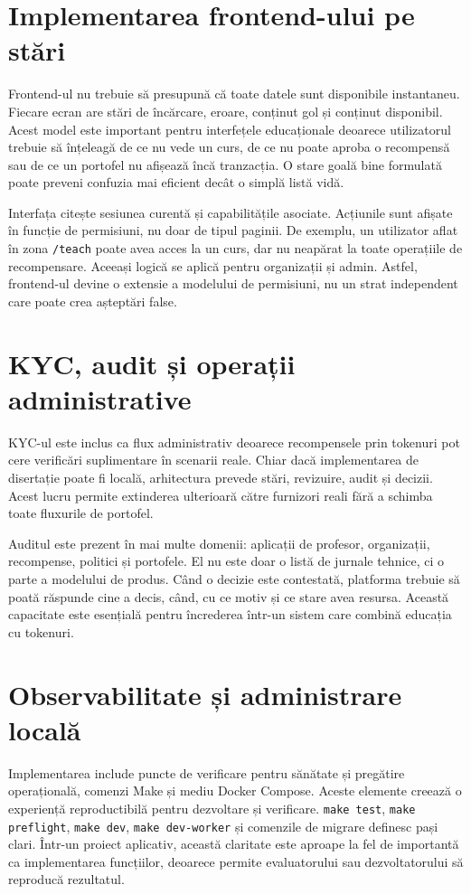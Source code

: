\section{Implementarea frontend-ului pe stări}
Frontend-ul nu trebuie să presupună că toate datele sunt disponibile instantaneu. Fiecare ecran are stări de încărcare, eroare, conținut gol și conținut disponibil. Acest model este important pentru interfețele educaționale deoarece utilizatorul trebuie să înțeleagă de ce nu vede un curs, de ce nu poate aproba o recompensă sau de ce un portofel nu afișează încă tranzacția. O stare goală bine formulată poate preveni confuzia mai eficient decât o simplă listă vidă.

Interfața citește sesiunea curentă și capabilitățile asociate. Acțiunile sunt afișate în funcție de permisiuni, nu doar de tipul paginii. De exemplu, un utilizator aflat în zona \texttt{/teach} poate avea acces la un curs, dar nu neapărat la toate operațiile de recompensare. Aceeași logică se aplică pentru organizații și admin. Astfel, frontend-ul devine o extensie a modelului de permisiuni, nu un strat independent care poate crea așteptări false.

\section{KYC, audit și operații administrative}
KYC-ul este inclus ca flux administrativ deoarece recompensele prin tokenuri pot cere verificări suplimentare în scenarii reale. Chiar dacă implementarea de disertație poate fi locală, arhitectura prevede stări, revizuire, audit și decizii. Acest lucru permite extinderea ulterioară către furnizori reali fără a schimba toate fluxurile de portofel.

Auditul este prezent în mai multe domenii: aplicații de profesor, organizații, recompense, politici și portofele. El nu este doar o listă de jurnale tehnice, ci o parte a modelului de produs. Când o decizie este contestată, platforma trebuie să poată răspunde cine a decis, când, cu ce motiv și ce stare avea resursa. Această capacitate este esențială pentru încrederea într-un sistem care combină educația cu tokenuri.

\section{Observabilitate și administrare locală}
Implementarea include puncte de verificare pentru sănătate și pregătire operațională, comenzi Make și mediu Docker Compose. Aceste elemente creează o experiență reproductibilă pentru dezvoltare și verificare. \texttt{make test}, \texttt{make preflight}, \texttt{make dev}, \texttt{make dev-worker} și comenzile de migrare definesc pași clari. Într-un proiect aplicativ, această claritate este aproape la fel de importantă ca implementarea funcțiilor, deoarece permite evaluatorului sau dezvoltatorului să reproducă rezultatul.

